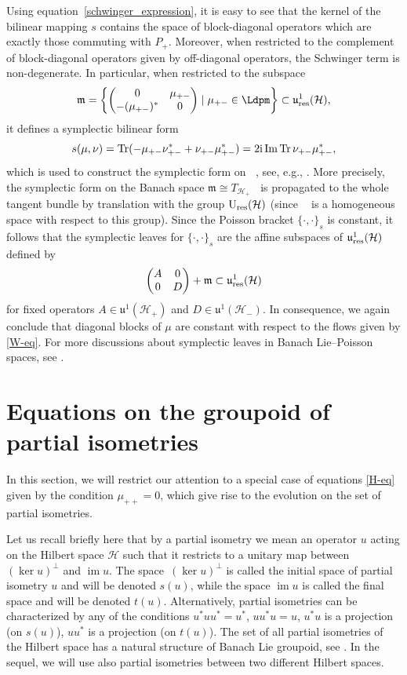 \documentclass[10pt,a4paper]{amsart}
\theoremstyle{definition}
\numberwithin{equation}{section}
\renewcommand{\H}{\mathcal{H}}
\DeclareMathOperator{\Gr}{Gr_{res}(\H,\H_+)}
\newcommand{\Ur}{\mathrm{U}_{\textnormal{res}}(\H)}
\newcommand{\uujp}{\mathfrak u^1(\H_+)}\newcommand{\uujm}{\mathfrak u^1(\H_-)}
\newcommand{\urp}{\mathfrak u_{\textnormal{res}}^1(\H)}
\DeclareMathOperator{\Tr}{Tr}
\DeclareMathOperator{\im}{im}
\newcommand{\pb}{\{\cdot,\cdot\}}
\begin{document}
Using equation~\eqref{schwinger_expression}, it is easy to see that the kernel of the bilinear mapping $s$ contains the space of block-diagonal operators which are exactly those commuting with $P_+$. Moreover, when restricted to the complement of block-diagonal operators given by off-diagonal operators, the Schwinger term is non-degenerate. In particular, when restricted to the subspace
\[
\mathfrak{m} =
\left\{\left(
\begin{matrix}
 0 & \mu_{+-}\\
 -(\mu_{+-})^* & 0\\
\end{matrix}
\right) \mid \mu_{+-}\in\Ldpm\right\}\subset \urp,
\]
it defines a symplectic bilinear form
\[
s(\mu,\nu)=\Tr(-\mu_{+-}\nu^*_{+-}+\nu_{+-}\mu^*_{+-}) = 2{\rm i} \operatorname{Im} \Tr \nu_{+-}\mu^*_{+-},
\]
which is used to construct the symplectic form on $\Gr$, see, e.g., \cite{Ratiu-grass,wurzbacher}. More precisely, the symplectic form on the Banach space $\mathfrak{m}\cong T_{\H_+}\Gr$ is propagated to the whole tangent bundle by translation with the group $\Ur$ (since $\Gr$ is a homogeneous space with respect to this group).
Since the Poisson bracket $\pb_s$ is constant, it follows that the symplectic leaves for $\pb_s$ are the affine subspaces of $\urp$ defined by %
\[
\left(
\begin{matrix}
 A & 0\\
 0 & D
\end{matrix}
\right) + \mathfrak m \subset \urp \]
for fixed operators $A\in\uujp$ and $D\in\uujm$.
In consequence, we again conclude that diagonal blocks of $\mu$ are constant with respect to the flows given by \eqref{W-eq}. For more discussions about symplectic leaves in Banach Lie--Poisson spaces, see \cite{beltita05}.

\section{Equations on the groupoid of partial isometries}\label{sec:partiso}

In this section, we will restrict our attention to a special case of equations \eqref{H-eq} given by the condition $\mu_{++}=0$, which give rise to the evolution on the set of partial isometries.

Let us recall briefly here that by a partial isometry we mean an operator $u$ acting on the Hilbert space $\H$ such that it restricts to a unitary map between $(\ker u)^\perp$ and $\im u$. The space~$(\ker u)^\perp$ is called the initial space of partial isometry $u$ and will be denoted $s(u)$, while the space $\im u$ is called the final space and will be denoted $t(u)$. Alternatively, partial isometries can be characterized by any of the conditions
$u^*uu^*=u^*$, $uu^*u=u$, $ u^*u$ is a projection (on $ s(u)$), $uu^*$ is a projection (on $t(u)$).
The set of all partial isometries of the Hilbert space has a natural structure of Banach Lie groupoid, see \cite{OS}. In the sequel, we will use also partial isometries between two different Hilbert spaces.
\end{document}
